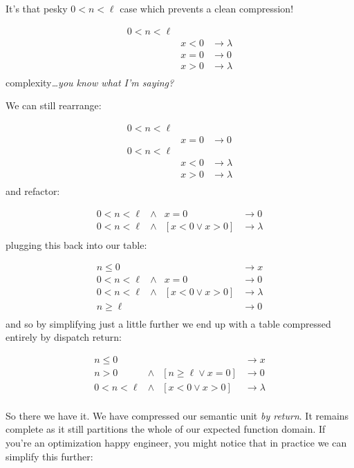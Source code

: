 \documentclass[twoside]{article}
\begin{document}
It's that pesky $ 0 < n < \ell $ case which prevents a clean compression!

$$ \begin{array}{r|ll}
0 < n < \ell	& \\
		& x < 0		& \to \lambda	\\
		& x = 0		& \to 0		\\
		& x > 0		& \to \lambda	\\
\end{array} $$
complexity\emph{\ldots you know what I'm saying?}

\newpage

We can still rearrange:

$$ \begin{array}{r|ll}
0 < n < \ell	& \\
		& x = 0		& \to 0		\\
0 < n < \ell	& \\
		& x < 0		& \to \lambda	\\
		& x > 0		& \to \lambda	\\
\end{array} $$
and refactor:

$$ \begin{array}{rcl|l}
0 < n < \ell	& \wedge	& x = 0			& \to 0		\\
0 < n < \ell	& \wedge	& [x < 0 \vee x > 0]	& \to \lambda	\\
\end{array} $$
plugging this back into our table:

$$ \begin{array}{rcl|l}
n \le 0		& 		&			& \to x		\\
0 < n < \ell	& \wedge	& x = 0			& \to 0		\\
0 < n < \ell	& \wedge	& [x < 0 \vee x > 0]	& \to \lambda	\\
n \ge \ell	& 		& 			& \to 0		\\
\end{array} $$
and so by simplifying just a little further we end up with a table compressed entirely by dispatch return:

$$ \begin{array}{rcl|l}
n \le 0		& 		&				& \to x		\\
n > 0		& \wedge	& [n \ge \ell \vee x = 0]	& \to 0		\\
0 < n < \ell	& \wedge	& [x < 0 \vee x > 0]		& \to \lambda	\\
\end{array} $$

So there we have it. We have compressed our semantic unit \emph{by return}. It remains
complete as it still partitions the whole of our expected function domain. If you're an
optimization happy engineer, you might notice that in practice we can simplify this further:
\end{document}
